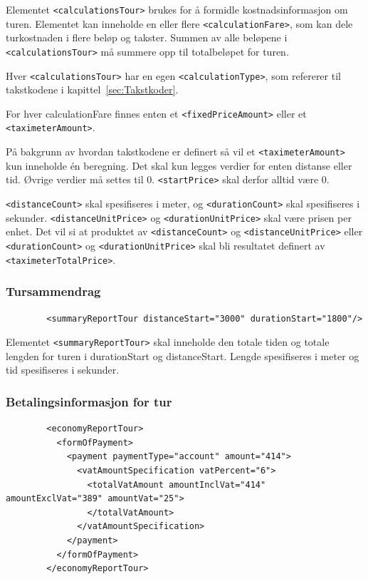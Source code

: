 \documentclass[a4paper,titlepage,norsk,11pt]{article}
\begin{document}
Elementet \lstinline{<calculationsTour>} brukes for å formidle kostnadsinformasjon om turen. Elementet kan inneholde en eller flere \lstinline{<calculationFare>}, som kan dele turkostnaden i flere beløp og takster. Summen av alle beløpene i \lstinline{<calculationsTour>} må summere opp til totalbeløpet for turen.

Hver \lstinline{<calculationsTour>} har en egen \lstinline{<calculationType>}, som refererer til takstkodene i kapittel~\ref{sec:Takstkoder}.

For hver calculationFare finnes enten et \lstinline{<fixedPriceAmount>} eller et \lstinline{<taximeterAmount>}.

På bakgrunn av hvordan takstkodene er definert så vil et \lstinline{<taximeterAmount>} kun inneholde én beregning. Det skal kun legges verdier for enten distanse eller tid. Øvrige verdier må settes til 0. \lstinline{<startPrice>} skal derfor alltid være 0.

\lstinline{<distanceCount>} skal spesifiseres i meter, og \lstinline{<durationCount>} skal spesifiseres i sekunder. \lstinline{<distanceUnitPrice>} og \lstinline{<durationUnitPrice>} skal være prisen per enhet. Det vil si at produktet av \lstinline{<distanceCount>} og \lstinline{<distanceUnitPrice>} eller \lstinline{<durationCount>} og \lstinline{<durationUnitPrice>} skal bli resultatet definert av \lstinline{<taximeterTotalPrice>}.

\subsubsection{Tursammendrag}

\begin{lstlisting}
        <summaryReportTour distanceStart="3000" durationStart="1800"/>
\end{lstlisting}

Elementet \lstinline{<summaryReportTour>} skal inneholde den totale tiden og totale lengden for turen i durationStart og distanceStart. Lengde spesifiseres i meter og tid spesifiseres i sekunder.

\subsubsection{Betalingsinformasjon for tur}

\begin{lstlisting}
        <economyReportTour>
          <formOfPayment>
            <payment paymentType="account" amount="414">
              <vatAmountSpecification vatPercent="6">
                <totalVatAmount amountInclVat="414" amountExclVat="389" amountVat="25">
                </totalVatAmount>
              </vatAmountSpecification>
            </payment>
          </formOfPayment>
        </economyReportTour>
\end{lstlisting}
\end{document}
